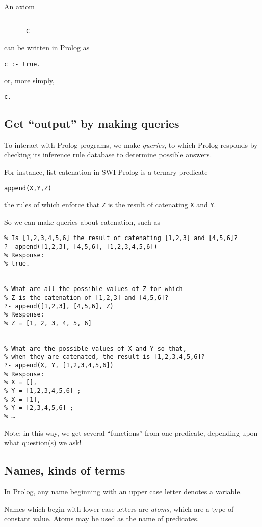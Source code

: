 \documentclass[11pt]{article}
\begin{document}
An axiom
\begin{verbatim}
––––––––––––––
      C
\end{verbatim}
can be written in Prolog as
\begin{verbatim}
c :- true.
\end{verbatim}
or, more simply,
\begin{verbatim}
c.
\end{verbatim}

\subsection{Get “output” by making queries}
\label{sec:orgafaf846}
To interact with Prolog programs, we make \emph{queries}, to which Prolog
responds by checking its inference rule database to determine
possible answers.

For instance, list catenation in SWI Prolog is a ternary predicate
\begin{verbatim}
append(X,Y,Z)
\end{verbatim}
the rules of which enforce that \texttt{Z} is the result
of catenating \texttt{X} and \texttt{Y}.

So we can make queries about catenation, such as
\begin{verbatim}
% Is [1,2,3,4,5,6] the result of catenating [1,2,3] and [4,5,6]?
?- append([1,2,3], [4,5,6], [1,2,3,4,5,6])
% Response:
% true.


% What are all the possible values of Z for which
% Z is the catenation of [1,2,3] and [4,5,6]?
?- append([1,2,3], [4,5,6], Z)
% Response:
% Z = [1, 2, 3, 4, 5, 6]


% What are the possible values of X and Y so that,
% when they are catenated, the result is [1,2,3,4,5,6]?
?- append(X, Y, [1,2,3,4,5,6])
% Response:
% X = [],
% Y = [1,2,3,4,5,6] ;
% X = [1],
% Y = [2,3,4,5,6] ;
% …
\end{verbatim}

Note: in this way, we get several “functions” from one predicate,
depending upon what question(s) we ask!

\subsection{Names, kinds of terms}
\label{sec:org7b251a2}
In Prolog, any name beginning with an upper case letter
denotes a variable.

Names which begin with lower case letters are \emph{atoms},
which are a type of constant value.
Atoms may be used as the name of predicates.
\end{document}
